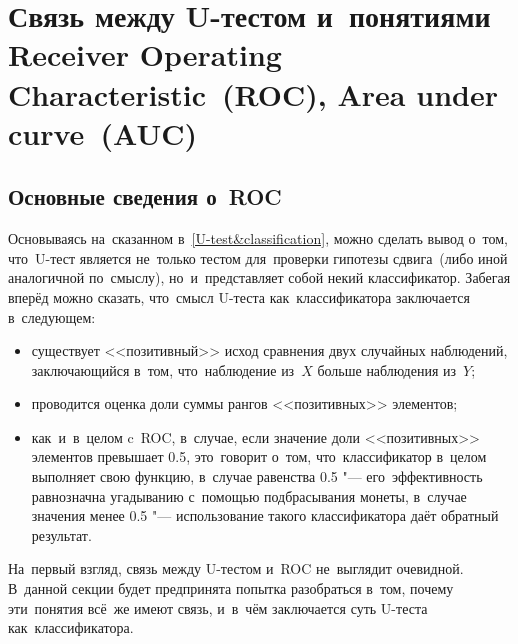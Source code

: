 \documentclass[]{scrreprt}
\begin{document}
\section{Связь между U-тестом и~понятиями \foreignlanguage{english}{Receiver Operating Characteristic~(ROC), Area under curve~(AUC)}}\label{U-AUC}
%
\subsection{Основные сведения о~ROC}
Основываясь на~сказанном в~\ref{U-test&classification}, можно сделать вывод о~том, что~U-тест является не~только тестом для~проверки гипотезы сдвига~(либо иной аналогичной по~смыслу), но~и~представляет собой некий классификатор. Забегая вперёд можно сказать, что~смысл U-теста как~классификатора заключается в~следующем:
\begin{itemize}
	\item существует <<позитивный>> исход сравнения двух случайных наблюдений, заключающийся в~том, что~наблюдение из~$X$ больше наблюдения из~$Y$;
	\item проводится оценка доли суммы рангов <<позитивных>> элементов;
	\item как~и~в~целом c~ROC, в~случае, если значение доли <<позитивных>> элементов превышает 0.5, это~говорит о~том, что~классификатор в~целом выполняет свою функцию, в~случае равенства 0.5 "--- его~эффективность равнозначна угадыванию с~помощью подбрасывания монеты, в~случае значения менее 0.5 "--- использование такого классификатора даёт обратный результат. 
\end{itemize}
На~первый взгляд, связь между U-тестом и~ROC не~выглядит очевидной. В~данной секции будет предпринята попытка разобраться в~том, почему эти~понятия всё~же имеют связь, и~в~чём заключается суть U-теста как~классификатора.
\end{document}
